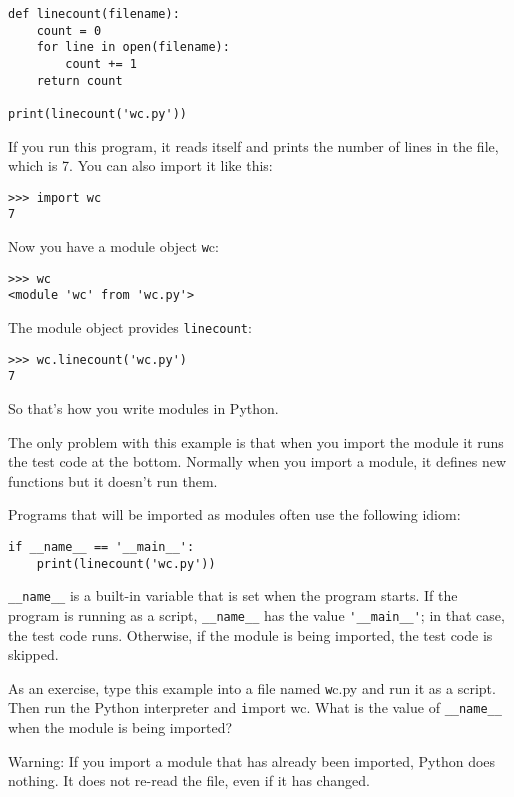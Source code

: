 \documentclass[
DIV=11,
fontsize=13,
twoside,
headinclude=false,
titlepage=firstiscover,
abstract=true,
headsepline=true,
footsepline=true,
chapterprefix=true, %
headings=big,
bibliography=totoc,%
captions=tableheading
]{scrbook}
\theoremstyle{definition}
\begin{document}
\begin{lstlisting}
def linecount(filename):
    count = 0
    for line in open(filename):
        count += 1
    return count

print(linecount('wc.py'))
\end{lstlisting}
%
If you run this program, it reads itself and prints the number
of lines in the file, which is 7.
You can also import it like this:

\begin{lstlisting}
>>> import wc
7
\end{lstlisting}
%
Now you have a module object {\texttt wc}:

\begin{lstlisting}
>>> wc
<module 'wc' from 'wc.py'>
\end{lstlisting}
%
The module object provides \verb"linecount":

\begin{lstlisting}
>>> wc.linecount('wc.py')
7
\end{lstlisting}
%
So that's how you write modules in Python.

The only problem with this example is that when you import
the module it runs the test code at the bottom.  Normally
when you import a module, it defines new functions but it
doesn't run them.

Programs that will be imported as modules often
use the following idiom:

\begin{lstlisting}
if __name__ == '__main__':
    print(linecount('wc.py'))
\end{lstlisting}
%
\verb"__name__" is a built-in variable that is set when the
program starts.  If the program is running as a script,
\verb"__name__" has the value \verb"'__main__'"; in that
case, the test code runs.  Otherwise,
if the module is being imported, the test code is skipped.


As an exercise, type this example into a file named {\texttt wc.py} and run
it as a script.  Then run the Python interpreter and
{\texttt import wc}.  What is the value of \verb"__name__"
when the module is being imported?

Warning: If you import a module that has already been imported,
Python does nothing.  It does not re-read the file, even if it has
changed.
\end{document}
